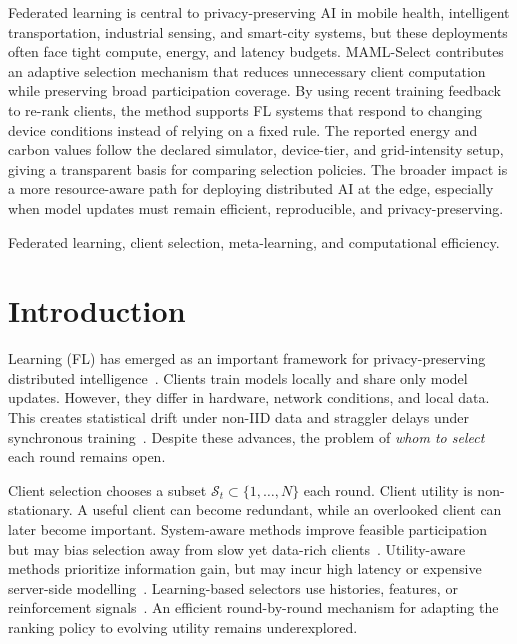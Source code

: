 \documentclass[journal]{IEEEtran}
\newcommand{\revision}[1]{#1}
\begin{document}
\renewcommand\IEEEkeywordsname{Impact Statement}
\begin{IEEEkeywords}
\revision{Federated learning is central to privacy-preserving AI in mobile health, intelligent transportation, industrial sensing, and smart-city systems, but these deployments often face tight compute, energy, and latency budgets. MAML-Select contributes an adaptive selection mechanism that reduces unnecessary client computation while preserving broad participation coverage. By using recent training feedback to re-rank clients, the method supports FL systems that respond to changing device conditions instead of relying on a fixed rule. The reported energy and carbon values follow the declared simulator, device-tier, and grid-intensity setup, giving a transparent basis for comparing selection policies. The broader impact is a more resource-aware path for deploying distributed AI at the edge, especially when model updates must remain efficient, reproducible, and privacy-preserving.}


\end{IEEEkeywords}
\renewcommand\IEEEkeywordsname{Index Terms}
\begin{IEEEkeywords}
Federated learning, client selection, meta-learning, and computational efficiency.
\end{IEEEkeywords}
\section{Introduction}

 Learning (FL) has emerged as \revision{an important} framework for privacy-preserving distributed intelligence~\cite{mcmahan2017communication}. \revision{Clients train models locally and share only model updates. However, they differ in hardware, network conditions, and local data. This creates statistical drift under non-IID data and straggler delays under synchronous training}~\cite{karimireddy2020scaffold,mai2024study,tapwal2026stragglers,forootani2026asynchronous,borazjani2026redefining}. Despite these advances, the problem of \textit{whom to select} each round remains open.

Client selection chooses a subset $\revision{\mathcal{S}_t} \subset \{1, \ldots, N\}$ each round. \revision{Client utility is non-stationary. A useful client can become redundant, while an overlooked client can later become important.} System-aware methods improve feasible participation but may bias selection away from slow yet data-rich clients~\cite{nishio2019client,chai2020tifl}. Utility-aware methods prioritize information gain, but may incur high latency or expensive server-side modelling~\cite{lai2021oort,tang2022fedcor,xu2024federated,yan2023criticalfl,ning2024fedgcs}. Learning-based selectors use histories, features, or reinforcement signals~\cite{wang2020optimizing,pan2024contextual,kazemi2026robust}. \revision{An efficient round-by-round mechanism for adapting the ranking policy to evolving utility remains underexplored.}
\end{document}
